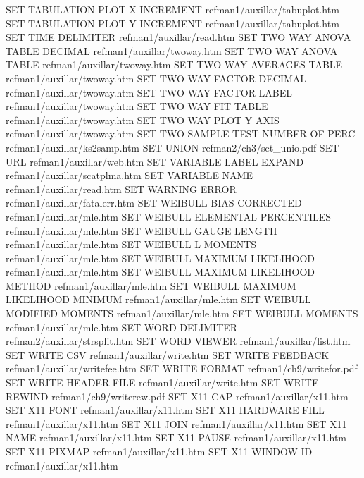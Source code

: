 SET TABULATION PLOT X INCREMENT         refman1/auxillar/tabuplot.htm
SET TABULATION PLOT Y INCREMENT         refman1/auxillar/tabuplot.htm
SET TIME DELIMITER                      refman1/auxillar/read.htm
SET TWO WAY ANOVA TABLE DECIMAL         refman1/auxillar/twoway.htm
SET TWO WAY ANOVA TABLE                 refman1/auxillar/twoway.htm
SET TWO WAY AVERAGES TABLE              refman1/auxillar/twoway.htm
SET TWO WAY FACTOR DECIMAL              refman1/auxillar/twoway.htm
SET TWO WAY FACTOR LABEL                refman1/auxillar/twoway.htm
SET TWO WAY FIT TABLE                   refman1/auxillar/twoway.htm
SET TWO WAY PLOT Y AXIS                 refman1/auxillar/twoway.htm
SET TWO SAMPLE TEST NUMBER OF PERC      refman1/auxillar/ks2samp.htm
SET UNION                               refman2/ch3/set_unio.pdf
SET URL                                 refman1/auxillar/web.htm
SET VARIABLE LABEL EXPAND               refman1/auxillar/scatplma.htm
SET VARIABLE NAME                       refman1/auxillar/read.htm
SET WARNING ERROR                       refman1/auxillar/fatalerr.htm
SET WEIBULL BIAS CORRECTED              refman1/auxillar/mle.htm
SET WEIBULL ELEMENTAL PERCENTILES       refman1/auxillar/mle.htm
SET WEIBULL GAUGE LENGTH                refman1/auxillar/mle.htm
SET WEIBULL L MOMENTS                   refman1/auxillar/mle.htm
SET WEIBULL MAXIMUM LIKELIHOOD          refman1/auxillar/mle.htm
SET WEIBULL MAXIMUM LIKELIHOOD METHOD   refman1/auxillar/mle.htm
SET WEIBULL MAXIMUM LIKELIHOOD MINIMUM  refman1/auxillar/mle.htm
SET WEIBULL MODIFIED MOMENTS            refman1/auxillar/mle.htm
SET WEIBULL MOMENTS                     refman1/auxillar/mle.htm
SET WORD DELIMITER                      refman2/auxillar/strsplit.htm
SET WORD VIEWER                         refman1/auxillar/list.htm
SET WRITE CSV                           refman1/auxillar/write.htm
SET WRITE FEEDBACK                      refman1/auxillar/writefee.htm
SET WRITE FORMAT                        refman1/ch9/writefor.pdf
SET WRITE HEADER FILE                   refman1/auxillar/write.htm
SET WRITE REWIND                        refman1/ch9/writerew.pdf
SET X11 CAP                             refman1/auxillar/x11.htm
SET X11 FONT                            refman1/auxillar/x11.htm
SET X11 HARDWARE FILL                   refman1/auxillar/x11.htm
SET X11 JOIN                            refman1/auxillar/x11.htm
SET X11 NAME                            refman1/auxillar/x11.htm
SET X11 PAUSE                           refman1/auxillar/x11.htm
SET X11 PIXMAP                          refman1/auxillar/x11.htm
SET X11 WINDOW ID                       refman1/auxillar/x11.htm
